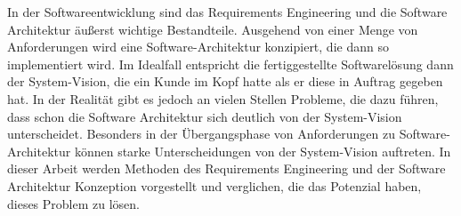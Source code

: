 In der Softwareentwicklung sind das Requirements Engineering und die Software Architektur äußerst wichtige Bestandteile. Ausgehend von einer Menge von Anforderungen wird eine Software-Architektur konzipiert, die dann so implementiert wird. Im Idealfall entspricht die fertiggestellte Softwarelösung dann der System-Vision, die ein Kunde im Kopf hatte als er diese in Auftrag gegeben hat. In der Realität gibt es jedoch an vielen Stellen Probleme, die dazu führen, dass schon die Software Architektur sich deutlich von der System-Vision unterscheidet. Besonders in der Übergangsphase von Anforderungen zu Software-Architektur können starke Unterscheidungen von der System-Vision auftreten. In dieser Arbeit werden Methoden des Requirements Engineering und der Software Architektur Konzeption vorgestellt und verglichen, die das Potenzial haben, dieses Problem zu lösen.